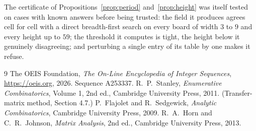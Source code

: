 \documentclass[11pt,a4paper]{article}
\theoremstyle{plain}
\theoremstyle{definition}
\begin{document}
The certificate of Propositions~\ref{prop:period} and~\ref{prop:height} was itself tested
on cases with known answers before being trusted: the field it produces agrees cell for cell
with a direct breadth-first search on every board of width $3$ to $9$ and every height up to
$59$; the threshold it computes is tight, the height below it genuinely disagreeing; and
perturbing a single entry of its table by one makes it refuse.

\begin{thebibliography}{9}
 The OEIS Foundation, \emph{The On-Line Encyclopedia of Integer
Sequences}, \url{https://oeis.org}, 2026. Sequence A253337.
 R.~P.~Stanley, \emph{Enumerative Combinatorics}, Volume 1, 2nd ed.,
Cambridge University Press, 2011. (Transfer-matrix method, Section 4.7.)
 P.~Flajolet and R.~Sedgewick, \emph{Analytic Combinatorics}, Cambridge
University Press, 2009.
 R.~A.~Horn and C.~R.~Johnson, \emph{Matrix Analysis}, 2nd ed., Cambridge
University Press, 2013.
\end{thebibliography}
\end{document}
